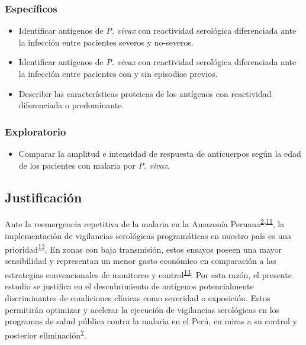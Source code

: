\documentclass[a4paper]{article}
\providecommand{\tightlist}{%
  \setlength{\itemsep}{0pt}\setlength{\parskip}{0pt}}
\begin{document}
\subsubsection{Específicos}\label{especificos}

\begin{itemize}
\item
  Identificar antígenos de \emph{P. vivax} con reactividad serológica
  diferenciada ante la infección entre pacientes severos y no-severos.
\item
  Identificar antígenos de \emph{P. vivax} con reactividad serológica
  diferenciada ante la infección entre pacientes con y sin episodios
  previos.
\item
  Describir las características proteicas de los antígenos con
  reactividad diferenciada o predominante.
\end{itemize}

\subsubsection{Exploratorio}\label{exploratorio}

\begin{itemize}
\tightlist
\item
  Comparar la amplitud e intensidad de respuesta de anticuerpos según la
  edad de los pacientes con malaria por \emph{P. vivax}.
\end{itemize}

\subsection{Justificación}\label{justif}

Ante la reemergencia repetitiva de la malaria en la Amazonía
Peruana\textsuperscript{\protect\hyperlink{ref-rosas2016peru}{2},\protect\hyperlink{ref-griffing2013history}{11}},
la implementación de vigilancias serológicas programáticas en nuestro
país es una
prioridad\textsuperscript{\protect\hyperlink{ref-hotspots2015}{12}}. En
zonas con baja transmisión, estos ensayos poseen una mayor sensibilidad
y representan un menor gasto económico en comparación a las estrategias
convencionales de monitoreo y
control\textsuperscript{\protect\hyperlink{ref-elliott2014}{13}}. Por
esta razón, el presente estudio se justifica en el descubrimiento de
antígenos potencialmente discriminantes de condiciones clínicas como
severidad o exposición. Estos permitirán optimizar y acelerar la
ejecución de vigilancias serológicas en los programas de salud pública
contra la malaria en el Perú, en miras a su control y posterior
eliminación\textsuperscript{\protect\hyperlink{ref-accelerate2016}{7}}.
\end{document}
